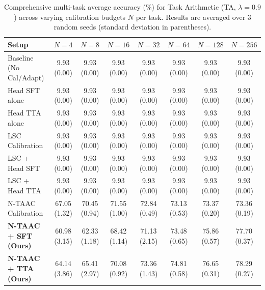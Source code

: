 \documentclass{article}
\theoremstyle{plain}
\theoremstyle{definition}
\theoremstyle{remark}
\begin{document}
\begin{table}[ht]
\centering
\caption{Comprehensive multi-task average accuracy (\%) for Task Arithmetic (TA, $\lambda=0.9$) across varying calibration budgets $N$ per task. Results are averaged over 3 random seeds (standard deviation in parentheses).}
\label{tab:appendix_ta_09}
\vskip 0.15in
\begin{sc}
\begin{scriptsize}
\setlength{\tabcolsep}{3pt}
\begin{tabular}{lccccccc}
\toprule
Setup & $N=4$ & $N=8$ & $N=16$ & $N=32$ & $N=64$ & $N=128$ & $N=256$ \\
\midrule
Baseline (No Cal/Adapt) & 9.93 (0.00) & 9.93 (0.00) & 9.93 (0.00) & 9.93 (0.00) & 9.93 (0.00) & 9.93 (0.00) & 9.93 (0.00) \\
Head SFT alone & 9.93 (0.00) & 9.93 (0.00) & 9.93 (0.00) & 9.93 (0.00) & 9.93 (0.00) & 9.93 (0.00) & 9.93 (0.00) \\
Head TTA alone & 9.93 (0.00) & 9.93 (0.00) & 9.93 (0.00) & 9.93 (0.00) & 9.93 (0.00) & 9.93 (0.00) & 9.93 (0.00) \\
LSC Calibration & 9.93 (0.00) & 9.93 (0.00) & 9.93 (0.00) & 9.93 (0.00) & 9.93 (0.00) & 9.93 (0.00) & 9.93 (0.00) \\
LSC + Head SFT & 9.93 (0.00) & 9.93 (0.00) & 9.93 (0.00) & 9.93 (0.00) & 9.93 (0.00) & 9.93 (0.00) & 9.93 (0.00) \\
LSC + Head TTA & 9.93 (0.00) & 9.93 (0.00) & 9.93 (0.00) & 9.93 (0.00) & 9.93 (0.00) & 9.93 (0.00) & 9.93 (0.00) \\
N-TAAC Calibration & 67.05 (1.32) & 70.45 (0.94) & 71.55 (1.00) & 72.84 (0.49) & 73.13 (0.53) & 73.37 (0.20) & 73.36 (0.19) \\
\textbf{N-TAAC + SFT (Ours)} & 60.98 (3.15) & 62.33 (1.18) & 68.42 (1.14) & 71.13 (2.15) & 73.48 (0.65) & 75.86 (0.57) & 77.70 (0.37) \\
\textbf{N-TAAC + TTA (Ours)} & 64.14 (3.86) & 65.41 (2.97) & 70.08 (0.92) & 73.36 (1.43) & 74.81 (0.58) & 76.65 (0.31) & 78.29 (0.27) \\
\bottomrule
\end{tabular}
\end{scriptsize}
\end{sc}
\end{table}
\end{document}
